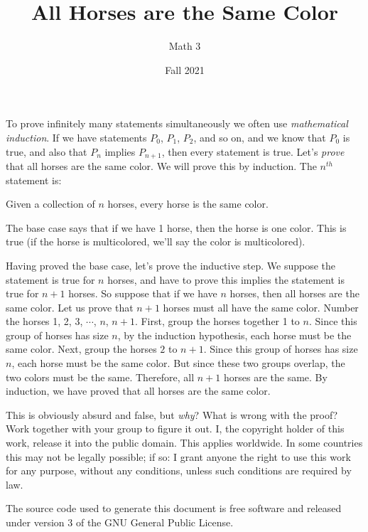 \documentclass{article}
\title{All Horses are the Same Color}
\author{Math 3}
\date{Fall 2021}
\theoremstyle{normal}
\theoremstyle{plain}
\begin{document}
    \maketitle
    To prove infinitely many statements simultaneously we often use
    \textit{mathematical induction}. If we have statements
    $P_{0}$, $P_{1}$, $P_{2}$, and so on, and we know that $P_{0}$ is true,
    and also that $P_{n}$ implies $P_{n+1}$, then every statement is true.
    Let's \textit{prove} that all horses are the same color.
    We will prove this by induction. The $n^{th}$ statement is:
    \begin{center}
        Given a collection of $n$ horses, every horse is the same color.
    \end{center}
    \par\hfill\par
    The base case says that if we have 1 horse, then the horse is one color.
    This is true (if the horse is multicolored, we'll say the color is
    multicolored).
    \par\hfill\par
    Having proved the base case, let's prove the inductive step. We suppose
    the statement is true for $n$ horses, and have to prove this implies the
    statement is true for $n+1$ horses. So suppose that if we have $n$ horses,
    then all horses are the same color. Let us prove that $n+1$ horses must
    all have the same color. Number the horses 1, 2, 3, $\cdots$, $n$, $n+1$.
    First, group the horses together 1 to $n$. Since this group of horses has
    size $n$, by the induction hypothesis, each horse must be the same color.
    Next, group the horses $2$ to $n+1$. Since this group of horses has size
    $n$, each horse must be the same color. But since these two groups overlap,
    the two colors must be the same. Therefore, all $n+1$ horses are the same.
    By induction, we have proved that all horses are the same color.
    \par\hfill\par
    This is obviously absurd and false, but \textit{why}? What is wrong with
    the proof? Work together with your group to figure it out.
    \newpage
    I, the copyright holder of this work, release it into the public domain.
    This applies worldwide. In some countries this may not be legally possible;
    if so: I grant anyone the right to use this work for any purpose, without
    any conditions, unless such conditions are required by law.
    \par\hfill\par
    The source code used to generate this document is free software and released
    under version 3 of the GNU General Public License.
\end{document}

